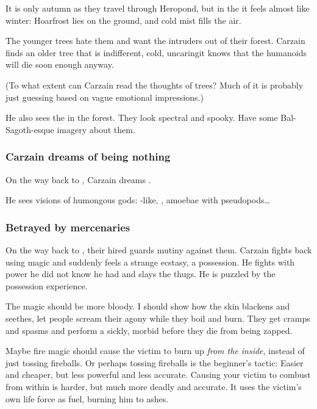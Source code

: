 It is only autumn as they travel through Heropond, but in the \Wylde it feels almost like winter: Hoarfrost lies on the ground, and cold mist fills the air.

The younger trees hate them and want the intruders out of their forest. Carzain finds an older tree that is indifferent, cold, uncaring\dash it knows that the humanoids will die soon enough anyway. 

(To what extent can Carzain read the thoughts of trees? Much of it is probably just guessing based on vague emotional impressions.)

He also sees the  in the forest. They look spectral and spooky. Have some Bal-Sagoth-esque imagery about them.






\subsubsection{Carzain dreams of being nothing}
On the way back to , Carzain dreams . 

He sees visions of humongous gods: 
\Human-like, \dragons, amoebae with pseudopods\ldots{}





\subsubsection{Betrayed by mercenaries}
On the way back to , their hired guards mutiny against them. Carzain fights back using magic and suddenly feels a strange ecstasy, a possession. He fights with power he did not know he had and slays the thugs. He is puzzled by the possession experience. 

The magic should be more bloody. I should show how the skin blackens and seethes, let people scream their agony while they boil and burn. They get cramps and spasms and perform a sickly, morbid  before they die from being zapped. 

Maybe fire magic should cause the victim to burn up \emph{from the inside}, instead of just tossing fireballs. Or perhaps tossing fireballs is the beginner's tactic: Easier and cheaper, but less powerful and less accurate. Causing your victim to combust from within is harder, but much more deadly and accurate. It uses the victim's own life force as fuel, burning him to ashes. 

